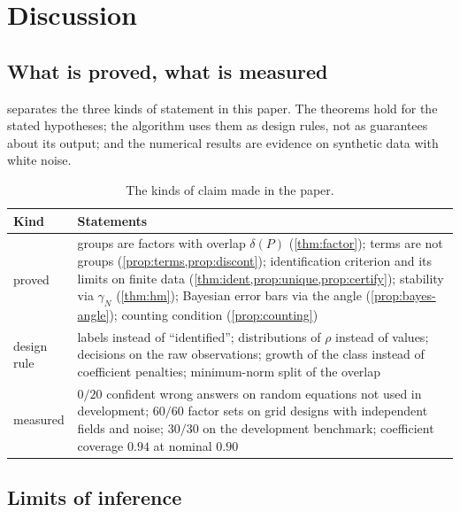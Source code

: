 \documentclass[11pt]{article}
\theoremstyle{plain}
\theoremstyle{definition}
\theoremstyle{remark}
\newcommand{\gN}{\gamma_{N}}                %
\newcommand{\deltaP}{\delta(P)}             %
\begin{document}



\section{Discussion}\label{sec:discussion}
\subsection{What is proved, what is measured}
 separates the three kinds of statement in this paper. The theorems hold for the stated hypotheses; the
algorithm uses them as design rules, not as guarantees about its output; and the numerical results are evidence on
synthetic data with white noise.


\begin{table}[tbp]
\centering\small
\caption{The kinds of claim made in the paper.}\label{tab:status}
\begin{tabularx}{\linewidth}{@{}>{\raggedright\arraybackslash}p{2.2cm}X@{}}
\toprule
Kind & Statements\\
\midrule
proved & groups are factors with overlap $\deltaP$ (\cref{thm:factor}); terms are not groups (\cref{prop:terms,prop:discont});
identification criterion and its limits on finite data (\cref{thm:ident,prop:unique,prop:certify}); stability via
$\gN$ (\cref{thm:hm}); Bayesian error bars via the angle (\cref{prop:bayes-angle}); counting condition (\cref{prop:counting})\\
design rule & labels instead of ``identified''; distributions of $\rho$ instead of values; decisions on the raw observations;
growth of the class instead of coefficient penalties; minimum-norm split of the overlap\\
measured & $0/20$ confident wrong answers on random equations not used in development; $60/60$ factor sets on grid
designs with independent fields and noise; $30/30$ on the development benchmark; coefficient coverage $0.94$ at
nominal $0.90$\\
\bottomrule
\end{tabularx}
\end{table}



\subsection{Limits of inference}\label{sec:limits}
\end{document}
